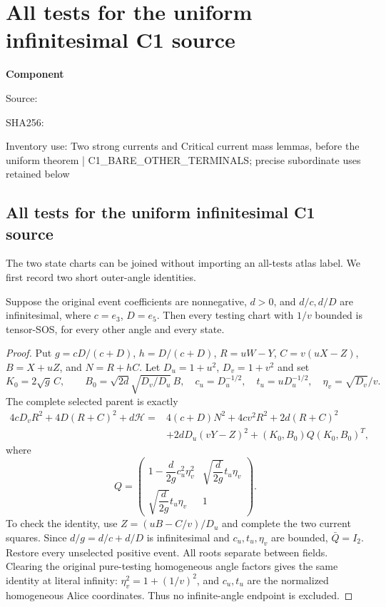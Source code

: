 \chapter{All tests for the uniform infinitesimal C1 source}
\label{component:p6cad7544d1b8}
\noindent\textbf{Component }\par
{\small\noindent Source: \par}
{\small\noindent SHA256: \par}
{\small\noindent Inventory use: Two strong currents and Critical current mass lemmas, before the uniform theorem | C1\_\allowbreak{}BARE\_\allowbreak{}OTHER\_\allowbreak{}TERMINALS; precise subordinate uses retained below\par}
\medskip
\section{All tests for the uniform infinitesimal C1 source}
\label{p6cad7544d1b8:sec:c1-uniform-all-tests}

The two state charts can be joined without importing an all-tests atlas
label. We first record two short outer-angle identities.

\begin{lemma}
Suppose the original event coefficients are nonnegative, $d>0$, and
$d/c,d/D$ are infinitesimal, where $c=e_3$, $D=e_5$.
Then every testing chart with $1/v$ bounded is tensor-SOS, for every
other angle and every state.
\end{lemma}
\begin{proof}
Put $g=cD/(c+D)$, $h=D/(c+D)$, $R=uW-Y$,
$C=v(uX-Z)$, $B=X+uZ$, and $N=R+hC$.
Let $D_u=1+u^2$, $D_v=1+v^2$ and set
\[
 K_0=2\sqrt g\,C,\qquad
 B_0=\sqrt{2d}\sqrt{D_v/D_u}\,B,\quad
 c_u=D_u^{-1/2},\quad t_u=uD_u^{-1/2},\quad
 \eta_v=\sqrt{D_v}/v.
\]
The complete selected parent is exactly
\[
\begin{split}
4cD_vR^2+4D(R+C)^2+d\mathcal H
={}&4(c+D)N^2+4cv^2R^2+2d(R+C)^2\\
 &+2dD_u(vY-Z)^2+(K_0,B_0)Q(K_0,B_0)^T,
\end{split}
\]
where
\[
 Q=\begin{pmatrix}
 1-\dfrac{d}{2g}c_u^2\eta_v^2&
 \sqrt{\dfrac{d}{2g}}t_u\eta_v\\
 \sqrt{\dfrac{d}{2g}}t_u\eta_v&1
 \end{pmatrix}.
\]
To check the identity, use $Z=(uB-C/v)/D_u$ and complete the two current
squares. Since $d/g=d/c+d/D$ is infinitesimal and $c_u,t_u,\eta_v$
are bounded, $\bar Q=I_2$. Restore every unselected positive event.
All roots separate between fields. Clearing the original pure-testing
homogeneous angle factors gives the same identity at literal infinity:
$\eta_v^2=1+(1/v)^2$, and $c_u,t_u$ are the normalized homogeneous
Alice coordinates. Thus no infinite-angle endpoint is excluded.
\end{proof}

